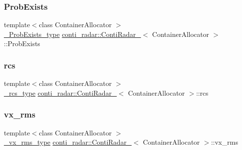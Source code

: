 \mbox{\label{structconti__radar_1_1ContiRadar___a0fe5d37ec3b23b7b53e378f423fbf37d}} 
\subsubsection{\texorpdfstring{Prob\+Exists}{ProbExists}}
{\footnotesize\ttfamily template$<$class Container\+Allocator $>$ \\
\hyperlink{structconti__radar_1_1ContiRadar___a130da4dcf3dfa54c90c29a54f91d921c}{\+\_\+\+Prob\+Exists\+\_\+type} \hyperlink{structconti__radar_1_1ContiRadar__}{conti\+\_\+radar\+::\+Conti\+Radar\+\_\+}$<$ Container\+Allocator $>$\+::Prob\+Exists}

\mbox{\label{structconti__radar_1_1ContiRadar___a76c90c92aba75c35d6eb4d25251cc632}} 
\subsubsection{\texorpdfstring{rcs}{rcs}}
{\footnotesize\ttfamily template$<$class Container\+Allocator $>$ \\
\hyperlink{structconti__radar_1_1ContiRadar___a54a5686feab91c3c0cbd68cdb6bee7db}{\+\_\+rcs\+\_\+type} \hyperlink{structconti__radar_1_1ContiRadar__}{conti\+\_\+radar\+::\+Conti\+Radar\+\_\+}$<$ Container\+Allocator $>$\+::rcs}

\mbox{\label{structconti__radar_1_1ContiRadar___a81b86774c20ba76f43bbed573635dfd8}} 
\subsubsection{\texorpdfstring{vx\+\_\+rms}{vx\_rms}}
{\footnotesize\ttfamily template$<$class Container\+Allocator $>$ \\
\hyperlink{structconti__radar_1_1ContiRadar___acae61db5456424612b9f89f891b8f65f}{\+\_\+vx\+\_\+rms\+\_\+type} \hyperlink{structconti__radar_1_1ContiRadar__}{conti\+\_\+radar\+::\+Conti\+Radar\+\_\+}$<$ Container\+Allocator $>$\+::vx\+\_\+rms}

